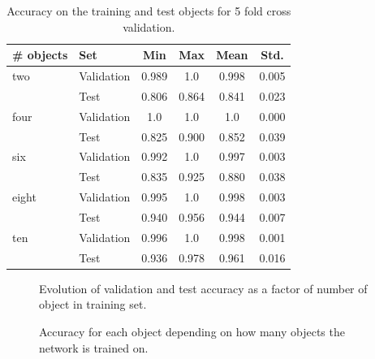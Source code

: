 \begin{table}
	\centering
	\begin{tabular}{l | l | c | c | c | c}
		\hline
		\# objects & Set        & Min   & Max   & Mean  & Std.  \\ \hline
		two
		& Validation & 0.989 & 1.0   & 0.998 & 0.005 \\
		& Test       & 0.806 & 0.864 & 0.841 & 0.023 \\ \hline

		four
		& Validation & 1.0   & 1.0   & 1.0   & 0.000 \\
		& Test       & 0.825 & 0.900 & 0.852 & 0.039 \\ \hline

		six
		& Validation & 0.992 & 1.0   & 0.997 & 0.003 \\
		& Test       & 0.835 & 0.925 & 0.880 & 0.038 \\ \hline

		eight
		& Validation & 0.995 & 1.0   & 0.998 & 0.003 \\
		& Test       & 0.940 & 0.956 & 0.944 & 0.007 \\ \hline

		ten
		& Validation & 0.996 & 1.0   & 0.998 & 0.001 \\
		& Test       & 0.936 & 0.978 & 0.961 & 0.016 \\ \hline
	\end{tabular}
	\caption{Accuracy on the training and test objects for 5 fold cross validation.}
	\label{tab:results_perobj}
\end{table}

\begin{figure}
	
	\caption{Evolution of validation and test accuracy as a factor of number of object in training set.}
	\label{fig:object_impact}
\end{figure}

\begin{figure}
	
	\caption{Accuracy for each object depending on how many objects the network is trained on.}
	\label{fig:object_impact_heatmap}
\end{figure}

